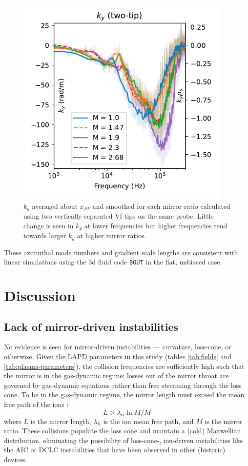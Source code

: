 \begin{figure}
    \centering
    \includegraphics[width=300pt]{figures/fig18.pdf}
    \caption{$k_y$ averaged about $x_{PF}$ and smoothed for each mirror ratio calculated using two vertically-separated Vf tips on the same probe. Little change is seen in $k_y$ at lower frequencies but higher frequencies tend towards larger $k_y$ at higher mirror ratios.}
    \label{fig:kperp}
\end{figure}
These azimuthal mode numbers and gradient scale lengths are consistent with linear simulations using the 3d fluid code \texttt{BOUT} \cite{Popovich_2010} in the flat, unbiased case.

\section{\label{sec:discussion}Discussion}
\subsection{Lack of mirror-driven instabilities}
No evidence is seen for mirror-driven instabilities — curvature, loss-cone, or otherwise. Given the LAPD parameters in this study (tables \ref{tab:fields} and \ref{tab:plasma-parameters}), the collision frequencies are sufficiently high such that the mirror is in the gas-dynamic regime: losses out of the mirror throat are governed by gas-dynamic equations rather than free streaming through the loss cone. To be in the gas-dynamic regime, the mirror length must exceed the mean free path of the ions \cite{Ivanov_2013}:
\begin{equation}
    L > \lambda_{ii} \ln{M} / M
\end{equation}
where $L$ is the mirror length, $\lambda_{ii}$ is the ion mean free path, and $M$ is the mirror ratio.
These collisions populate the loss cone and maintain a (cold) Maxwellian distribution, eliminating the possibility of loss-cone-, ion-driven instabilities like the AIC \cite{Casper_1982} or DCLC \cite{Simonen_1976,Kanaev_1979} instabilities that have been observed in other (historic) devices. 

